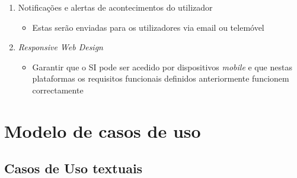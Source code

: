 \documentclass[12pt, a4paper, twoside]{report} %
\begin{document}
\begin{enumerate}
\begin{itemize}
	\end{itemize}
\item Notificações e alertas de acontecimentos do utilizador
\begin{itemize}
\item Estas serão enviadas para os utilizadores via email ou telemóvel
\end{itemize}
\item \textit {Responsive Web Design}
\begin{itemize}
\item Garantir que o SI pode ser acedido por dispositivos \textit{mobile} e que nestas plataformas os requisitos funcionais definidos anteriormente funcionem correctamente
\end{itemize}
\end{enumerate}

\section{Modelo de casos de uso}
\subsection{Casos de Uso textuais}
\end{document}
